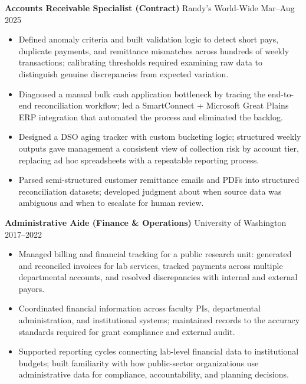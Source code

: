 \documentclass[11pt,a4paper]{article}
\begin{document}
\vspace{0.2cm}
\noindent
\textbf{Accounts Receivable Specialist (Contract)} \hfill Randy's World-Wide \hfill Mar--Aug 2025
\begin{itemize}
    \item Defined anomaly criteria and built validation logic to detect short pays, duplicate payments, and remittance mismatches across hundreds of weekly transactions; calibrating thresholds required examining raw data to distinguish genuine discrepancies from expected variation.
    \item Diagnosed a manual bulk cash application bottleneck by tracing the end-to-end reconciliation workflow; led a SmartConnect + Microsoft Great Plains ERP integration that automated the process and eliminated the backlog.
    \item Designed a DSO aging tracker with custom bucketing logic; structured weekly outputs gave management a consistent view of collection risk by account tier, replacing ad hoc spreadsheets with a repeatable reporting process.
    \item Parsed semi-structured customer remittance emails and PDFs into structured reconciliation datasets; developed judgment about when source data was ambiguous and when to escalate for human review.
\end{itemize}

\vspace{0.2cm}
\noindent
\textbf{Administrative Aide (Finance \& Operations)} \hfill University of Washington \hfill 2017--2022
\begin{itemize}
    \item Managed billing and financial tracking for a public research unit: generated and reconciled invoices for lab services, tracked payments across multiple departmental accounts, and resolved discrepancies with internal and external payors.
    \item Coordinated financial information across faculty PIs, departmental administration, and institutional systems; maintained records to the accuracy standards required for grant compliance and external audit.
    \item Supported reporting cycles connecting lab-level financial data to institutional budgets; built familiarity with how public-sector organizations use administrative data for compliance, accountability, and planning decisions.
\end{itemize}
\end{document}
